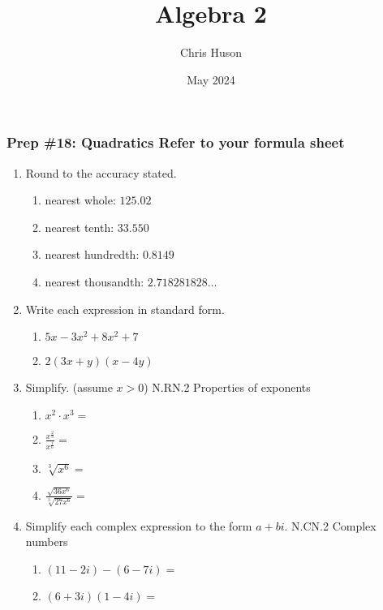 \documentclass[12pt, twoside]{article}
\title{Algebra 2}
\author{Chris Huson}
\date{May 2024}
\begin{document}
\subsubsection*{Prep \#18: Quadratics \hfill Refer to your formula sheet}
\begin{enumerate}[itemsep=0.5cm]
\item Round to the accuracy stated.
    \begin{multicols}{2}
    \begin{enumerate}[itemsep=1cm]
        \item nearest whole: $125.02$
        \item nearest tenth: $33.550$
        \item nearest hundredth: $0.8149$
        \item nearest thousandth: $2.718281828 \dots$
    \end{enumerate}
    \end{multicols} \vspace{0.5cm}

\item Write each expression in standard form.
    \begin{multicols}{2}
    \begin{enumerate}[itemsep=0.5cm]
        \item $5x-3x^2+8x^2+7$
        \item $2(3x+y)(x-4y)$
    \end{enumerate}
    \end{multicols} \vspace{4cm}

\item Simplify. (assume $x > 0$) \hfill N.RN.2 Properties of exponents
    \begin{multicols}{2}
    \begin{enumerate}[itemsep=1cm]
        \item $x^2 \cdot x^3 =$
        \item $\displaystyle \frac{x^{\frac{2}{3}}}{x^{\frac{1}{6}}} =$
        \item $\sqrt[3]{x^6} =$
        \item $\displaystyle \frac{\sqrt{36x^6}}{\sqrt[3]{27x^6}} = $
    \end{enumerate}
    \end{multicols} \vspace{1cm}


\item Simplify each complex expression to the form $a+bi$. \hfill N.CN.2 Complex numbers
    \begin{multicols}{2}
    \begin{enumerate}
        \item $(11-2i) - (6-7i)=$
        \item $(6+3i)(1-4i)=$
    \end{enumerate}
    \end{multicols} \vspace{3cm}


\end{enumerate}
\end{document}
